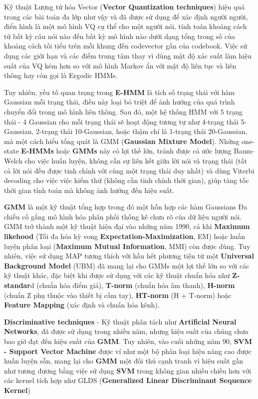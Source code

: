 \documentclass{article}
\begin{document}
	Kỹ thuật Lượng tử hóa Vector (\textbf{Vector Quantization techniques}) hiệu quả trong các bài toán đa lớp như vậy và đã được sử dụng để xác định người người, điển hình là một mô hình VQ cụ thể cho một người nói, tính toán khoảng cách từ bất kỳ câu nói nào đến bất kỳ mô hình nào dưới dạng tổng trong số của khoảng cách tối tiểu trên mỗi khung đến codevector gần của codebook. Việc sử dụng các giới hạn và các điểm trung tâm thay vì dùng mật độ xác suất làm hiệu suất của VQ kém hơn so với mô hình Markov ẩn với mật độ liên tục và liên thông hay còn gọi là Ergodic HMMs. 
	
	Tuy nhiên, yếu tố quan trọng trong \textbf{E-HMM} là tích số trạng thái với hàm Gaussian mỗi trạng thái, điều này loại bỏ triệt để ảnh hưởng của quá trình chuyển đổi trong mô hình liên thông. Sau đó, một hệ thống HMM với 5 trạng thái - 4 Gaussian cho mỗi trạng thái sẽ hoạt động tương tự như 4-trạng thái 5-Gaussian, 2-trạng thái 10-Gaussian, hoặc thậm chí là 1-trạng thái 20-Gaussian,  mà một cách hiểu tổng quát là GMM (\textbf{Gaussian Mixture Model}). Những one-state \textbf{E-HMMs} hoặc \textbf{GMMs} này có lợi thế lớn, tránh được cả ước lượng Baum-Welch cho việc huấn luyện, không cần sự liên kết giữa lời nói và trạng thái (tất cả lời nói đều được tinh chỉnh với cùng một trạng thái duy nhất) và dùng Viterbi decoding cho việc việc kiểm thử (không cần tinh chỉnh thời gian), giúp tăng tốc thời gian tính toán mà không ảnh hưởng đến hiệu suất.
	
	\textbf{GMM} là một kỹ thuật tổng hợp trong đó một hỗn hợp các hàm Gaussians Đa chiều cố gắng mô hình hóa phân phối thống kê chưa rõ của dữ liệu người nói. GMM trở thành một kỹ thuật hiện đại vào những năm 1990, cả khi \textbf{Maximum likehood} (Tối đa hóa kỳ vong \textbf{Expectation-Maximization}, EM) hoặc huấn luyện phân loại (\textbf{Maximum Mutual Information}, MMI) còn được dùng. Tuy nhiên, việc sử dụng MAP tương thích với hầu hết phương tiện từ một \textbf{Universal Background Model} (UBM) đã mang lại cho GMMs một lợi thế lớn so với các kỹ thuật khác, đặc biệt khi được sử dụng với các kỹ thuật chuẩn hóa như \textbf{Z-standar}d (chuẩn hóa điểm giả), \textbf{T-norm} (chuẩn hóa âm thanh), \textbf{H-norm} (chuẩn Z phụ thuộc vào thiết bị cầm tay), \textbf{HT-norm} (H + T-norm) hoặc \textbf{Feature Mapping} (xác định và chuẩn hóa kênh).
	
	\textbf{Discriminative techniques} - Kỹ thuật phân tách như \textbf{Artificial Neural Networks}, đã được sử dụng trong nhiều năm, nhưng hiệu suất của chúng chưa bao giờ đạt đến hiệu suất của \textbf{GMM}. Tuy nhiên, vào cuối những năm 90, \textbf{SVM - Support Vector Machine} được ví như một bộ phân loại hiệu năng cao được huấn luyện sẵn, mang lại cho \textbf{GMM} một đối thủ cạnh tranh vì hiệu suất gần như tương đương bằng việc sử dụng \textbf{SVM} trong không gian nhiều chiều hơn với các kernel tích hợp như GLDS (\textbf{Generalized Linear Discriminant Sequence Kernel})
	
\end{document}
